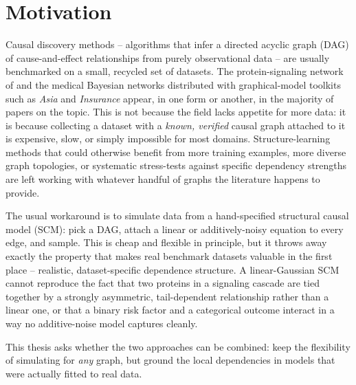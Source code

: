 \documentclass[
  english,
  class=report,
  accentcolor=2c,
  marginpar=false,
  parskip=half-,
  fontsize=11pt,
  ruledheaders=false,
  pdfa=false,
  IMRAD=false,
  thesis={type=master}
]{tudapub}
\begin{document}
\section{Motivation}
Causal discovery methods -- algorithms that infer a directed acyclic graph
(DAG) of cause-and-effect relationships from purely observational data --
are usually benchmarked on a small, recycled set of datasets. The
protein-signaling network of \textcite{sachs2005} and the medical
Bayesian networks distributed with graphical-model toolkits such as
\emph{Asia} \parencite{lauritzen1988} and \emph{Insurance}
\parencite{binder1997} appear, in one form or another, in the majority of
papers on the topic. This is not because the field lacks appetite for more
data: it is because collecting a dataset with a \emph{known, verified} causal
graph attached to it is expensive, slow, or simply impossible for most
domains. Structure-learning methods that could otherwise benefit from more
training examples, more diverse graph topologies, or systematic stress-tests
against specific dependency strengths are left working with whatever handful
of graphs the literature happens to provide.

The usual workaround is to simulate data from a hand-specified structural
causal model (SCM): pick a DAG, attach a linear or additively-noisy equation
to every edge, and sample. This is cheap and flexible in principle, but it
throws away exactly the property that makes real benchmark datasets valuable
in the first place -- realistic, dataset-specific dependence structure. A
linear-Gaussian SCM cannot reproduce the fact that two proteins in a
signaling cascade are tied together by a strongly asymmetric, tail-dependent
relationship rather than a linear one, or that a binary risk factor and a
categorical outcome interact in a way no additive-noise model captures
cleanly.

This thesis asks whether the two approaches can be combined: keep the
flexibility of simulating for \emph{any} graph, but ground the local
dependencies in models that were actually fitted to real data.
\end{document}
